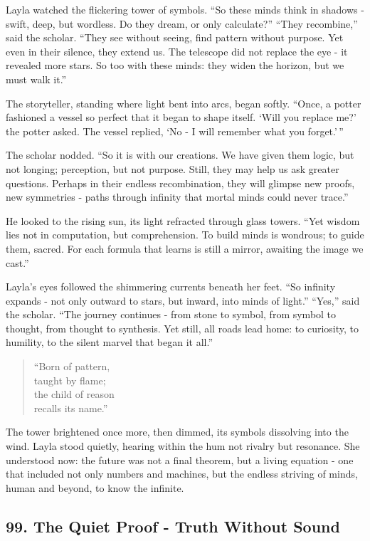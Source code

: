 \documentclass[
  letterpaper,
  DIV=11,
  numbers=noendperiod]{scrreprt}
\begin{document}
Layla watched the flickering tower of symbols. ``So these minds think in
shadows - swift, deep, but wordless. Do they dream, or only calculate?''
``They recombine,'' said the scholar. ``They see without seeing, find
pattern without purpose. Yet even in their silence, they extend us. The
telescope did not replace the eye - it revealed more stars. So too with
these minds: they widen the horizon, but we must walk it.''

The storyteller, standing where light bent into arcs, began softly.
``Once, a potter fashioned a vessel so perfect that it began to shape
itself. `Will you replace me?' the potter asked. The vessel replied, `No
- I will remember what you forget.'\,''

The scholar nodded. ``So it is with our creations. We have given them
logic, but not longing; perception, but not purpose. Still, they may
help us ask greater questions. Perhaps in their endless recombination,
they will glimpse new proofs, new symmetries - paths through infinity
that mortal minds could never trace.''

He looked to the rising sun, its light refracted through glass towers.
``Yet wisdom lies not in computation, but comprehension. To build minds
is wondrous; to guide them, sacred. For each formula that learns is
still a mirror, awaiting the image we cast.''

Layla's eyes followed the shimmering currents beneath her feet. ``So
infinity expands - not only outward to stars, but inward, into minds of
light.'' ``Yes,'' said the scholar. ``The journey continues - from stone
to symbol, from symbol to thought, from thought to synthesis. Yet still,
all roads lead home: to curiosity, to humility, to the silent marvel
that began it all.''

\begin{quote}
``Born of pattern,\\
taught by flame;\\
the child of reason\\
recalls its name.''
\end{quote}

The tower brightened once more, then dimmed, its symbols dissolving into
the wind. Layla stood quietly, hearing within the hum not rivalry but
resonance. She understood now: the future was not a final theorem, but a
living equation - one that included not only numbers and machines, but
the endless striving of minds, human and beyond, to know the infinite.

\subsection{99. The Quiet Proof - Truth Without
Sound}\label{the-quiet-proof---truth-without-sound}
\end{document}
